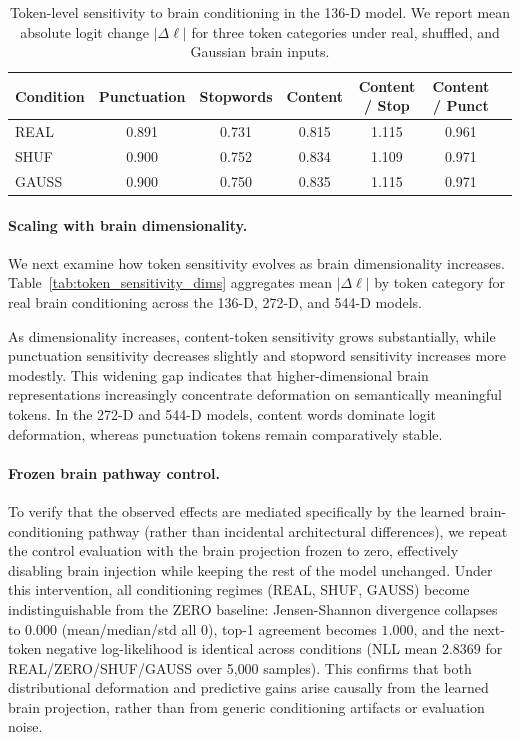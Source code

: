 \documentclass{article}
\theoremstyle{plain}
\theoremstyle{definition}
\theoremstyle{remark}
\begin{document}
\begin{table}[t]
\centering
\caption{Token-level sensitivity to brain conditioning in the 136-D model.
We report mean absolute logit change $|\Delta \ell|$ for three token categories under real, shuffled, and Gaussian brain inputs.}
\label{tab:token_sensitivity_controls}
\begin{tabular}{lcccccc}
\toprule
Condition & Punctuation & Stopwords & Content & Content / Stop & Content / Punct \\
\midrule
REAL   & 0.891 & 0.731 & 0.815 & 1.115 & 0.961 \\
SHUF   & 0.900 & 0.752 & 0.834 & 1.109 & 0.971 \\
GAUSS  & 0.900 & 0.750 & 0.835 & 1.115 & 0.971 \\
\bottomrule
\end{tabular}
\end{table}

\paragraph{Scaling with brain dimensionality.}
We next examine how token sensitivity evolves as brain dimensionality increases.
Table~\ref{tab:token_sensitivity_dims} aggregates mean $|\Delta \ell|$ by token category for real brain conditioning across the 136-D, 272-D, and 544-D models.

As dimensionality increases, content-token sensitivity grows substantially, while punctuation sensitivity decreases slightly and stopword sensitivity increases more modestly.
This widening gap indicates that higher-dimensional brain representations increasingly concentrate deformation on semantically meaningful tokens.
In the 272-D and 544-D models, content words dominate logit deformation, whereas punctuation tokens remain comparatively stable.



\paragraph{Frozen brain pathway control.}
To verify that the observed effects are mediated specifically by the learned brain-conditioning pathway (rather than incidental architectural differences), we repeat the control evaluation with the brain projection frozen to zero, effectively disabling brain injection while keeping the rest of the model unchanged.
Under this intervention, all conditioning regimes (REAL, SHUF, GAUSS) become indistinguishable from the ZERO baseline: Jensen-Shannon divergence collapses to $0.000$ (mean/median/std all $0$), top-1 agreement becomes $1.000$, and the next-token negative log-likelihood is identical across conditions (NLL mean $2.8369$ for REAL/ZERO/SHUF/GAUSS over 5{,}000 samples).
This confirms that both distributional deformation and predictive gains arise causally from the learned brain projection, rather than from generic conditioning artifacts or evaluation noise.
\end{document}
